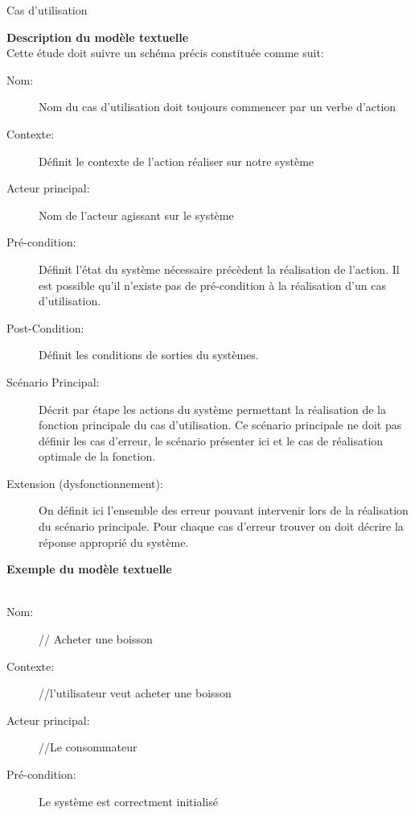 \begin{LQ}{Cas d'utilisation}


\textbf{Description du modèle textuelle}\\
Cette étude doit suivre un schéma précis constituée comme suit:
 \\
\begin{description}
\item[Nom:] Nom du cas d’utilisation doit toujours commencer par un verbe d’action
\item[Contexte: ]Définit le contexte de l’action réaliser sur notre système
\item[Acteur principal:] Nom de l’acteur agissant sur le système 
\item[Pré-condition:] Définit l’état du système nécessaire précèdent la réalisation de l’action. Il est possible qu’il n’existe pas de pré-condition à la réalisation d’un cas d’utilisation.
\item[Post-Condition:] Définit les conditions de sorties du systèmes.
\item[Scénario Principal:] Décrit par étape les actions du système permettant la réalisation de la fonction principale du cas d’utilisation. Ce scénario principale ne doit pas définir les cas d’erreur, le scénario présenter ici et le cas de réalisation optimale de la fonction.
 \item[Extension (dysfonctionnement):] On définit ici l’ensemble des erreur pouvant intervenir lors de la réalisation du scénario principale. Pour chaque cas d’erreur trouver on doit décrire la réponse approprié du système.

\end{description}


\textbf{Exemple du modèle textuelle}\\
 \\
\begin{description}
\item[Nom:]// Acheter une boisson
\item[Contexte:]//l’utilisateur veut acheter une boisson
\item[Acteur principal:] //Le consommateur
\item[Pré-condition:] Le système est correctment initialisé


\end{description}
\end{LQ}
